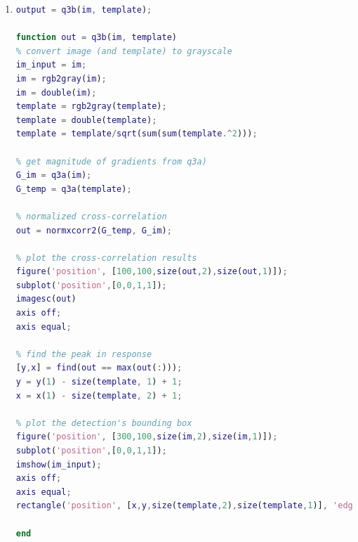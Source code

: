 \documentclass{csc_assignment4}
\begin{document}
\begin{description}
\begin{enumerate}[label=(\alph*)]
\newpage
\item 
\begin{lstlisting}[language=MATLAB]
% read image and template from q3a)
output = q3b(im, template);

function out = q3b(im, template)
% convert image (and template) to grayscale
im_input = im;
im = rgb2gray(im);
im = double(im);
template = rgb2gray(template);
template = double(template);
template = template/sqrt(sum(sum(template.^2)));

% get magnitude of gradients from q3a)
G_im = q3a(im);
G_temp = q3a(template);

% normalized cross-correlation
out = normxcorr2(G_temp, G_im);

% plot the cross-correlation results
figure('position', [100,100,size(out,2),size(out,1)]);
subplot('position',[0,0,1,1]);
imagesc(out)
axis off;
axis equal;

% find the peak in response
[y,x] = find(out == max(out(:)));
y = y(1) - size(template, 1) + 1;
x = x(1) - size(template, 2) + 1;

% plot the detection's bounding box
figure('position', [300,100,size(im,2),size(im,1)]);
subplot('position',[0,0,1,1]);
imshow(im_input);
axis off;
axis equal;
rectangle('position', [x,y,size(template,2),size(template,1)], 'edgecolor', [0.1,0.2,1], 'linewidth', 3.5);

end
\end{lstlisting}


\end{enumerate}
\end{description}
\end{document}
